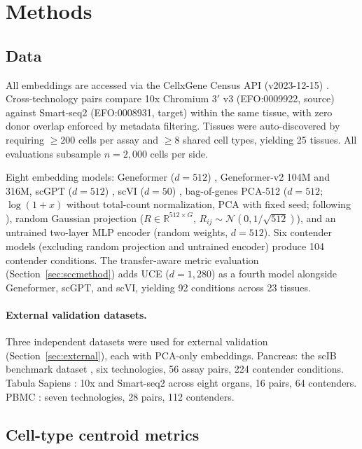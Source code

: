 \documentclass[11pt]{article}
\begin{document}
\section{Methods}

\subsection{Data}

All embeddings are accessed via the CellxGene Census API (v2023-12-15)
\citep{abdulla2025cellxgene}. Cross-technology pairs compare 10x
Chromium 3$'$ v3 (EFO:0009922, source) against Smart-seq2
(EFO:0008931, target) within the same tissue, with zero donor overlap
enforced by metadata filtering. Tissues were auto-discovered by
requiring $\geq 200$ cells per assay and $\geq 8$ shared cell types,
yielding 25 tissues. All evaluations subsample $n = 2{,}000$ cells per
side.

Eight embedding models: Geneformer ($d = 512$)
\citep{theodoris2023geneformer}, Geneformer-v2 104M and 316M,
scGPT ($d = 512$) \citep{cui2024scgpt}, scVI ($d = 50$)
\citep{lopez2018scvi}, bag-of-genes PCA-512 ($d = 512$;
$\log(1 + x)$ without total-count normalization, PCA with fixed seed;
following \citealp{cole2026morpheus}), random Gaussian projection
($R \in \mathbb{R}^{512 \times G}$, $R_{ij} \sim \mathcal{N}(0,
1/\sqrt{512})$), and an untrained two-layer MLP encoder (random weights,
$d = 512$). Six contender models (excluding random projection and
untrained encoder) produce 104 contender conditions. The
transfer-aware metric evaluation (Section~\ref{sec:sccmethod}) adds
UCE ($d = 1{,}280$) \citep{rosen2026uce} as a fourth model alongside
Geneformer, scGPT, and scVI, yielding 92 conditions across 23 tissues.

\paragraph{External validation datasets.} Three independent datasets
were used for external validation (Section~\ref{sec:external}), each
with PCA-only embeddings. Pancreas: the scIB benchmark dataset
\citep{luecken2022scib}, six technologies, 56 assay pairs, 224
contender conditions. Tabula Sapiens \citep{tabulasapiens2022}: 10x and
Smart-seq2 across eight organs, 16 pairs, 64 contenders. PBMC
\citep{ding2020systematic}: seven technologies, 28 pairs, 112
contenders.

\subsection{Cell-type centroid metrics}
\end{document}
